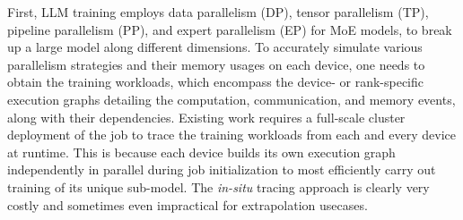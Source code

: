 First, LLM training employs {data parallelism (DP), tensor parallelism (TP), pipeline parallelism (PP), and expert parallelism (EP) for MoE models}, to break up a large model along different dimensions.
To accurately simulate {various parallelism strategies and their memory usages on each device}, one needs to obtain the training workloads, which encompass the device- or rank-specific execution graphs {detailing the computation, communication, and memory events, along with their dependencies.}
Existing work \cite{hu2022dpro,lu2023distsim,luo2022srifty,zhu2020daydream,SimAI2025NSDI} requires a full-scale cluster deployment of the job to trace the training workloads from each and every device at runtime.
This is because each device builds its own execution graph independently in parallel during job initialization to most efficiently carry out training of its unique sub-model.
The \textit{in-situ} tracing approach is clearly very costly and sometimes even impractical for extrapolation usecases.


